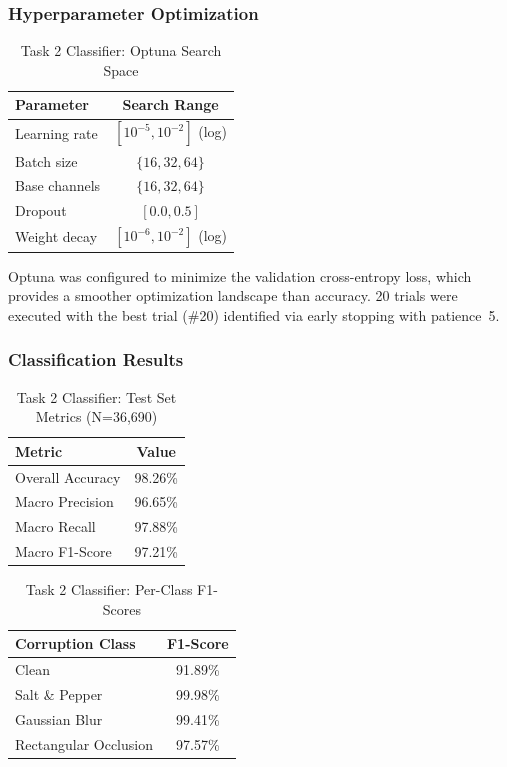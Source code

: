 \documentclass[conference]{IEEEtran}
\begin{document}
\subsubsection{Hyperparameter Optimization}

\begin{table}[H]
\centering
\caption{Task 2 Classifier: Optuna Search Space}
\label{tab:task2_cls_hpo}
\begin{tabular}{lc}
\toprule
\textbf{Parameter} & \textbf{Search Range} \\
\midrule
Learning rate & $[10^{-5}, 10^{-2}]$ (log) \\
Batch size & $\{16, 32, 64\}$ \\
Base channels & $\{16, 32, 64\}$ \\
Dropout & $[0.0, 0.5]$ \\
Weight decay & $[10^{-6}, 10^{-2}]$ (log) \\
\bottomrule
\end{tabular}
\end{table}

Optuna was configured to minimize the validation cross-entropy loss, which provides a smoother optimization landscape than accuracy. 20 trials were executed with the best trial (\#20) identified via early stopping with patience~5.

\subsubsection{Classification Results}

\begin{table}[H]
\centering
\caption{Task 2 Classifier: Test Set Metrics (N=36,690)}
\label{tab:task2_cls_results}
\begin{tabular}{lc}
\toprule
\textbf{Metric} & \textbf{Value} \\
\midrule
Overall Accuracy & 98.26\% \\
Macro Precision & 96.65\% \\
Macro Recall & 97.88\% \\
Macro F1-Score & 97.21\% \\
\bottomrule
\end{tabular}
\end{table}

\begin{table}[H]
\centering
\caption{Task 2 Classifier: Per-Class F1-Scores}
\label{tab:task2_cls_perclass}
\begin{tabular}{lc}
\toprule
\textbf{Corruption Class} & \textbf{F1-Score} \\
\midrule
Clean & 91.89\% \\
Salt \& Pepper & 99.98\% \\
Gaussian Blur & 99.41\% \\
Rectangular Occlusion & 97.57\% \\
\bottomrule
\end{tabular}
\end{table}
\end{document}
